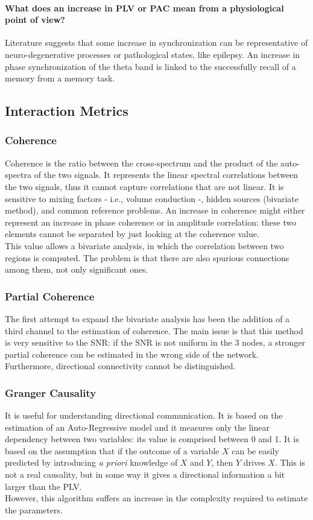 \paragraph{What does an increase in PLV or PAC mean from a physiological point of view?}
Literature suggests that some increase in synchronization can be representative of neuro-degenerative
processes or pathological states, like epilepsy. An increase in phase synchronization of the theta band
is linked to the successfully recall of a memory from a memory task.

\subsection{Interaction Metrics}
\subsubsection{Coherence}
Coherence is the ratio between the cross-spectrum and the product of the auto-spectra of the two signals. It represents the linear spectral correlations between the two
signals, thus it cannot capture correlations that are not linear. It is sensitive to mixing factors - i.e., volume conduction -, hidden sources (bivariate method), and
common reference problems. An increase in coherence might either represent an increase in phase coherence or in amplitude correlation: these two elements cannot be
separated by just looking at the coherence value.\\
This value allows a bivariate analysis, in which the correlation between two regions is computed. The problem is that there are also spurious connections among them,
not only significant ones.
\subsubsection{Partial Coherence}
The first attempt to expand the bivariate analysis has been the addition of a third channel to the estimation of coherence. The main issue is that this method is very
sensitive to the SNR: if the SNR is not uniform in the 3 nodes, a stronger partial coherence can be estimated in the wrong side of the network. Furthermore, directional
connectivity cannot be distinguished.
\subsubsection{Granger Causality}
It is useful for understanding directional communication. It is based on the estimation of an Auto-Regressive model and it measures only the linear dependency between
two variables: its value is comprised between 0 and 1. It is based on the assumption that if the outcome of a variable \(X\) can be easily predicted by introducing
\textit{a priori} knowledge of \(X\) and \(Y\), then \(Y\) drives \(X\). This is not a real causality, but in some way it gives a directional information a bit larger
than the PLV.\\
However, this algorithm suffers an increase in the complexity required to estimate the parameters.
